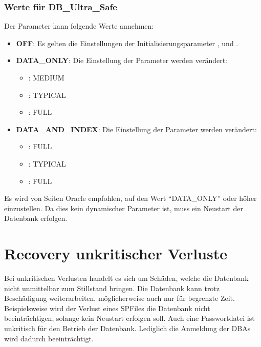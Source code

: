         \subsubsection{Werte f\"ur DB\_Ultra\_Safe}
          Der Parameter  kann folgende Werte annehmen:
          \begin{itemize}
            \item \textbf{OFF}: Es gelten die Einstellungen der Initialisierungsparameter ,  und .
            \item \textbf{DATA\_ONLY}: Die Einstellung der Parameter werden ver\"andert:
              \begin{itemize}
                \item {}: MEDIUM
                \item {}: TYPICAL
                \item {}: FULL
              \end{itemize}
            \item \textbf{DATA\_AND\_INDEX}: Die Einstellung der Parameter werden ver\"andert:
              \begin{itemize}
                \item {}: FULL
                \item {}: TYPICAL
                \item {}: FULL
              \end{itemize}
          \end{itemize}
          Es wird von Seiten Oracle empfohlen,  auf den Wert \enquote{DATA\_ONLY} oder h\"oher einzustellen. Da dies kein dynamischer Parameter ist, muss ein Neustart der Datenbank erfolgen.
    \section{Recovery unkritischer Verluste}
      Bei unkritischen Verlusten handelt es sich um Sch\"aden, welche die Datenbank nicht unmittelbar zum Stillstand bringen. Die Datenbank kann trotz Besch\"adigung weiterarbeiten, m\"oglicherweise auch nur f\"ur begrenzte Zeit. Beispielsweise wird der Verlust eines SPFiles die Datenbank nicht beeintr\"achtigen, solange kein Neustart erfolgen soll. Auch eine Passwortdatei ist unkritisch f\"ur den Betrieb der Datenbank. Lediglich die Anmeldung der DBAs wird dadurch beeintr\"achtigt.
